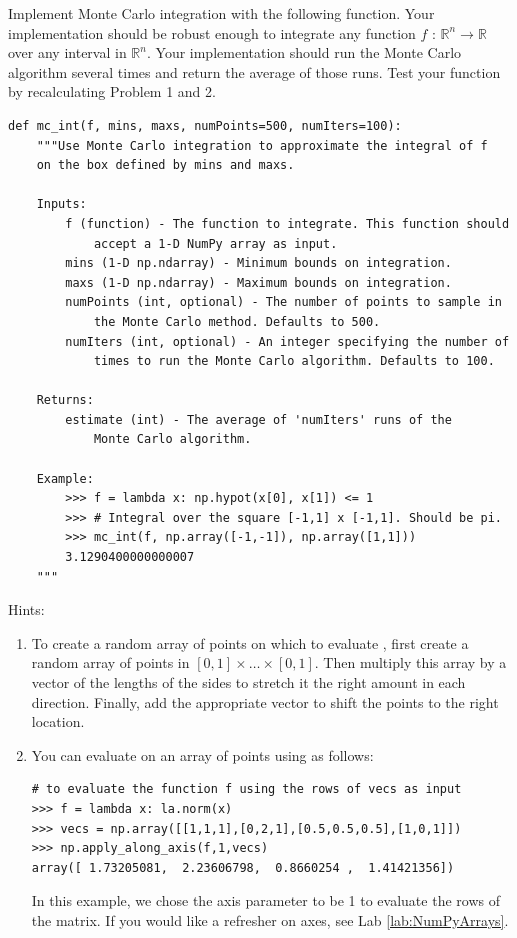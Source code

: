 \begin{problem}
\label{prob:mc}
Implement Monte Carlo integration with the following function. Your implementation should be robust enough to integrate any function $f$ : $\mathbb{R}^n \rightarrow \mathbb{R}$ over any interval in $\mathbb{R}^n$.
Your implementation should run the Monte Carlo algorithm several times 
and return the average of those runs. Test your function by recalculating Problem 1 and 2.
\begin{lstlisting}
def mc_int(f, mins, maxs, numPoints=500, numIters=100):
    """Use Monte Carlo integration to approximate the integral of f
    on the box defined by mins and maxs.
    
    Inputs:
        f (function) - The function to integrate. This function should 
            accept a 1-D NumPy array as input.
        mins (1-D np.ndarray) - Minimum bounds on integration.
        maxs (1-D np.ndarray) - Maximum bounds on integration.
        numPoints (int, optional) - The number of points to sample in 
            the Monte Carlo method. Defaults to 500.
        numIters (int, optional) - An integer specifying the number of 
            times to run the Monte Carlo algorithm. Defaults to 100.
        
    Returns:
        estimate (int) - The average of 'numIters' runs of the 
            Monte Carlo algorithm.
                
    Example:
        >>> f = lambda x: np.hypot(x[0], x[1]) <= 1
        >>> # Integral over the square [-1,1] x [-1,1]. Should be pi.
        >>> mc_int(f, np.array([-1,-1]), np.array([1,1]))
        3.1290400000000007
    """
\end{lstlisting}

Hints:
\begin{enumerate}
\item To create a random array of points on which to evaluate , first create a random array of points in $[0,1] \times \ldots \times [0,1]$.
Then multiply this array by a vector of the lengths of the sides to stretch it the right amount in each direction.
Finally, add the appropriate vector to shift the points to the right location.
\item You can evaluate  on an array of points using  as follows:
\begin{lstlisting}
# to evaluate the function f using the rows of vecs as input
>>> f = lambda x: la.norm(x)
>>> vecs = np.array([[1,1,1],[0,2,1],[0.5,0.5,0.5],[1,0,1]])
>>> np.apply_along_axis(f,1,vecs)
array([ 1.73205081,  2.23606798,  0.8660254 ,  1.41421356])
\end{lstlisting}
In this example, we chose the axis parameter to be 1 to evaluate the rows of the matrix. If you would like a refresher on axes, see Lab \ref{lab:NumPyArrays}.

\end{enumerate}
\end{problem}

